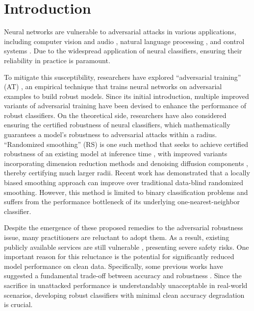 \documentclass[11pt, letterpaper]{article}
\theoremstyle{plain}
\theoremstyle{definition}
\begin{document}
\section{Introduction} \label{sec:intro}

Neural networks are vulnerable to adversarial attacks in various applications, including computer vision and audio \citep{Moosavi-Dezfooli16, Goodfellow15}, natural language processing \citep{Fursov22}, and control systems \citep{Huang17}. Due to the widespread application of neural classifiers, ensuring their reliability in practice is paramount.

To mitigate this susceptibility, researchers have explored ``adversarial training'' (AT) \citep{Kurakin17, Goodfellow15, Bai22a, Bai22b, Zheng20}, an empirical technique that trains neural networks on adversarial examples to build robust models. Since its initial introduction, multiple improved variants of adversarial training have been devised to enhance the performance of robust classifiers.
On the theoretical side, researchers have also considered ensuring the certified robustness of neural classifiers, which mathematically guarantees a model's robustness to adversarial attacks \citep{Anderson20, Ma20, Anderson21a} within a radius. ``Randomized smoothing'' (RS) is one such method that seeks to achieve certified robustness of an existing model at inference time \citep{Cohen19, Li19}, with improved variants incorporating dimension reduction methods \citep{Pfrommer23} and denoising diffusion components \citep{Carlini22}, thereby certifying much larger radii. Recent work \citep{Anderson21b} has demonstrated that a locally biased smoothing approach can improve over traditional data-blind randomized smoothing. However, this method is limited to binary classification problems and suffers from the performance bottleneck of its underlying one-nearest-neighbor classifier.

Despite the emergence of these proposed remedies to the adversarial robustness issue, many practitioners are reluctant to adopt them. As a result, existing publicly available services are still vulnerable \citep{Ilyas18, Borkar21}, presenting severe safety risks. One important reason for this reluctance is the potential for significantly reduced model performance on clean data. Specifically, some previous works have suggested a fundamental trade-off between accuracy and robustness \citep{Tsipas19, Zhang19}. Since the sacrifice in unattacked performance is understandably unacceptable in real-world scenarios, developing robust classifiers with minimal clean accuracy degradation is crucial.
\end{document}
